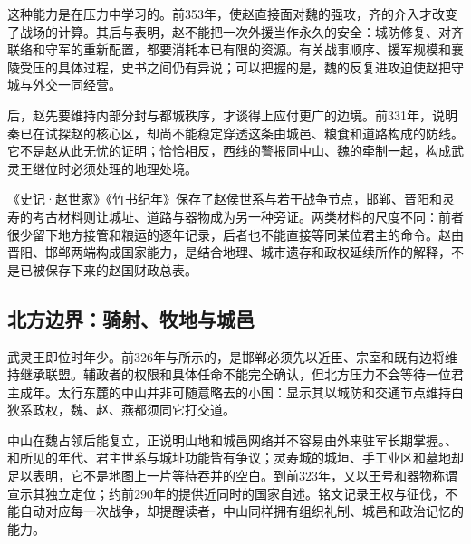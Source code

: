 这种能力是在压力中学习的。前353年，使赵直接面对魏的强攻，齐的介入才改变了战场的计算。其后与表明，赵不能把一次外援当作永久的安全：城防修复、对齐联络和守军的重新配置，都要消耗本已有限的资源。有关战事顺序、援军规模和襄陵受压的具体过程，史书之间仍有异说；可以把握的是，魏的反复进攻迫使赵把守城与外交一同经营。

后，赵先要维持内部分封与都城秩序，才谈得上应付更广的边境。前331年，说明秦已在试探赵的核心区，却尚不能稳定穿透这条由城邑、粮食和道路构成的防线。它不是赵从此无忧的证明；恰恰相反，西线的警报同中山、魏的牵制一起，构成武灵王继位时必须处理的地理处境。

\begin{sourcenote}
《史记·赵世家》《竹书纪年》保存了赵侯世系与若干战争节点，邯郸、晋阳和灵寿的考古材料则让城址、道路与器物成为另一种旁证。两类材料的尺度不同：前者很少留下地方接管和粮运的逐年记录，后者也不能直接等同某位君主的命令。赵由晋阳、邯郸两端构成国家能力，是结合地理、城市遗存和政权延续所作的解释，不是已被保存下来的赵国财政总表。
\end{sourcenote}

\subsection{北方边界：骑射、牧地与城邑}

武灵王即位时年少。前326年与所示的，是邯郸必须先以近臣、宗室和既有边将维持继承联盟。辅政者的权限和具体任命不能完全确认，但北方压力不会等待一位君主成年。太行东麓的中山并非可随意略去的小国：显示其以城防和交通节点维持白狄系政权，魏、赵、燕都须同它打交道。

中山在魏占领后能复立，正说明山地和城邑网络并不容易由外来驻军长期掌握。、和所见的年代、君主世系与城址功能皆有争议；灵寿城的城垣、手工业区和墓地却足以表明，它不是地图上一片等待吞并的空白。到前323年，又以王号和器物称谓宣示其独立定位；约前290年的提供近同时的国家自述。铭文记录王权与征伐，不能自动对应每一次战争，却提醒读者，中山同样拥有组织礼制、城邑和政治记忆的能力。

